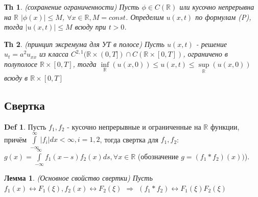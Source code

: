 \documentclass[14pt]{article}
\theoremstyle{plain}
\newtheorem{Thm}{Тh}
\newtheorem{Lem}{Лемма}
\theoremstyle{definition}
\newtheorem{Def}{Def}
\begin{document}
		\begin{Thm}
			(сохранение ограниченности) \newline
			Пусть $\phi \in C(\mathbb{R})$ или кусочно непрерывна на $\mathbb{R}$ $|\phi(x)| \leq M$, $\forall x \in \mathbb{R}, M = const$. Определим $u(x,t)$ по формулам (P), тогда $|u(x,t)| \leq M$ всюду при $t > 0$.
		\end{Thm}
		\begin{Thm}
			(принцип эксремума для УТ в полосе)\newline
			Пусть $u(x,t)$ - решение $u_t = a^2 u_{xx}$ из класса $C^{2,1} (\mathbb{R} \times (0,T] ) \cap C(\mathbb{R} \times [0, T])$, ограничено в полуполосе $\mathbb{R} \times [0,T]$, тогда $\inf\limits_{\mathbb{R}} (u(x,0)) \leq u(x,t) \leq \sup\limits_{\mathbb{R}} (u(x,0))$ всюду в $\mathbb{R} \times [0,T]$
		\end{Thm}
		\subsection{Свертка}
			\begin{Def}
				Пусть $f_1, f_2$ - кусочно непрерывные и ограниченные на $\mathbb{R}$ функции, причём $\int\limits_{-\infty}^{\infty} |f_i| dx < \infty, i=1,2$, тогда свертка для $f_1, f_2$: $g(x) = \int\limits_{-\infty}^{\infty} f_1(x-s)f_2(x) ds, \forall x \in \mathbb{R}$ (обозначение $g = (f_1 * f_2)(x))$).
			\end{Def}
			\begin{Lem}
				(Основное свойство свертки)\newline
				Пусть $f_1(x) \leftrightarrow F_1(\xi), f_2(x) \leftrightarrow F_2(\xi)$ $\Rightarrow$ $(f_1*f_2) \leftrightarrow F_1(\xi)F_2(\xi)	$
			\end{Lem}
		\newpage
\end{document}
